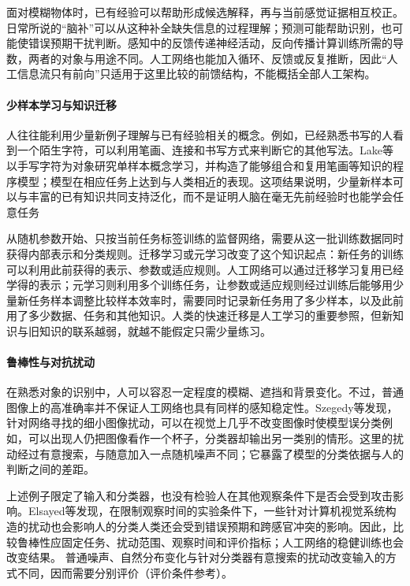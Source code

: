 面对模糊物体时，已有经验可以帮助形成候选解释，再与当前感觉证据相互校正。日常所说的“脑补”可以从这种补全缺失信息的过程理解；预测可能帮助识别，也可能使错误预期干扰判断。感知中的反馈传递神经活动，反向传播计算训练所需的导数，两者的对象与用途不同。人工网络也能加入循环、反馈或反复推断，因此“人工信息流只有前向”只适用于这里比较的前馈结构，不能概括全部人工架构。

\paragraph{少样本学习与知识迁移}
人往往能利用少量新例子理解与已有经验相关的概念。例如，已经熟悉书写的人看到一个陌生字符，可以利用笔画、连接和书写方式来判断它的其他写法。Lake等以手写字符为对象研究单样本概念学习，并构造了能够组合和复用笔画等知识的程序模型；模型在相应任务上达到与人类相近的表现。这项结果说明，少量新样本可以与丰富的已有知识共同支持泛化，而不是证明人脑在毫无先前经验时也能学会任意任务

从随机参数开始、只按当前任务标签训练的监督网络，需要从这一批训练数据同时获得内部表示和分类规则。迁移学习或元学习改变了这个知识起点：新任务的训练可以利用此前获得的表示、参数或适应规则。人工网络可以通过迁移学习复用已经学得的表示；元学习则利用多个训练任务，让参数或适应规则经过训练后能够用少量新任务样本调整比较样本效率时，需要同时记录新任务用了多少样本，以及此前用了多少数据、任务和其他知识。人类的快速迁移是人工学习的重要参照，但新知识与旧知识的联系越弱，就越不能假定只需少量练习。

\paragraph{鲁棒性与对抗扰动}
在熟悉对象的识别中，人可以容忍一定程度的模糊、遮挡和背景变化。不过，普通图像上的高准确率并不保证人工网络也具有同样的感知稳定性。Szegedy等发现，针对网络寻找的细小图像扰动，可以在视觉上几乎不改变图像时使模型误分类例如，可以出现人仍把图像看作一个杯子，分类器却输出另一类别的情形。这里的扰动经过有意搜索，与随意加入一点随机噪声不同；它暴露了模型的分类依据与人的判断之间的差距。

上述例子限定了输入和分类器，也没有检验人在其他观察条件下是否会受到攻击影响。Elsayed等发现，在限制观察时间的实验条件下，一些针对计算机视觉系统构造的扰动也会影响人的分类人类还会受到错误预期和跨感官冲突的影响。因此，比较鲁棒性应固定任务、扰动范围、观察时间和评价指标；人工网络的稳健训练也会改变结果。
普通噪声、自然分布变化与针对分类器有意搜索的扰动改变输入的方式不同，因而需要分别评价（评价条件参考）。

